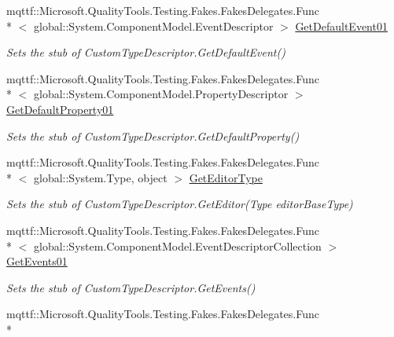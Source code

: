 \begin{DoxyCompactItemize}
mqttf\-::\-Microsoft.\-Quality\-Tools.\-Testing.\-Fakes.\-Fakes\-Delegates.\-Func\\*
$<$ global\-::\-System.\-Component\-Model.\-Event\-Descriptor $>$ \hyperlink{class_system_1_1_component_model_1_1_fakes_1_1_stub_custom_type_descriptor_a1e523560cb59a7f7b928ce78726a3cf3}{Get\-Default\-Event01}
\begin{DoxyCompactList}\small\item\em Sets the stub of Custom\-Type\-Descriptor.\-Get\-Default\-Event()\end{DoxyCompactList}\item 
mqttf\-::\-Microsoft.\-Quality\-Tools.\-Testing.\-Fakes.\-Fakes\-Delegates.\-Func\\*
$<$ global\-::\-System.\-Component\-Model.\-Property\-Descriptor $>$ \hyperlink{class_system_1_1_component_model_1_1_fakes_1_1_stub_custom_type_descriptor_a2f7ed50ca8b015cea1037492e220bbba}{Get\-Default\-Property01}
\begin{DoxyCompactList}\small\item\em Sets the stub of Custom\-Type\-Descriptor.\-Get\-Default\-Property()\end{DoxyCompactList}\item 
mqttf\-::\-Microsoft.\-Quality\-Tools.\-Testing.\-Fakes.\-Fakes\-Delegates.\-Func\\*
$<$ global\-::\-System.\-Type, object $>$ \hyperlink{class_system_1_1_component_model_1_1_fakes_1_1_stub_custom_type_descriptor_a94f48002c674eb60c8a7b336315383a3}{Get\-Editor\-Type}
\begin{DoxyCompactList}\small\item\em Sets the stub of Custom\-Type\-Descriptor.\-Get\-Editor(\-Type editor\-Base\-Type)\end{DoxyCompactList}\item 
mqttf\-::\-Microsoft.\-Quality\-Tools.\-Testing.\-Fakes.\-Fakes\-Delegates.\-Func\\*
$<$ global\-::\-System.\-Component\-Model.\-Event\-Descriptor\-Collection $>$ \hyperlink{class_system_1_1_component_model_1_1_fakes_1_1_stub_custom_type_descriptor_a049366c7a908a5f29cfc6a69f6f86b9c}{Get\-Events01}
\begin{DoxyCompactList}\small\item\em Sets the stub of Custom\-Type\-Descriptor.\-Get\-Events()\end{DoxyCompactList}\item 
mqttf\-::\-Microsoft.\-Quality\-Tools.\-Testing.\-Fakes.\-Fakes\-Delegates.\-Func\\*

\end{DoxyCompactItemize}
